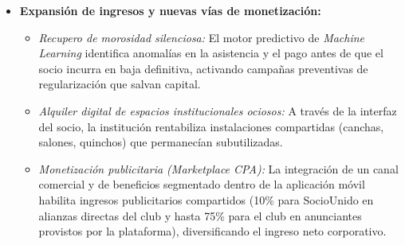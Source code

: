 \begin{itemize}
    \item \textbf{Expansión de ingresos y nuevas vías de monetización:}
    \begin{itemize}
        \item \textit{Recupero de morosidad silenciosa:} El motor predictivo de \textit{Machine Learning} identifica anomalías en la asistencia y el pago antes de que el socio incurra en baja definitiva, activando campañas preventivas de regularización que salvan capital.
        \item \textit{Alquiler digital de espacios institucionales ociosos:} A través de la interfaz del socio, la institución rentabiliza instalaciones compartidas (canchas, salones, quinchos) que permanecían subutilizadas.
        \item \textit{Monetización publicitaria (\textit{Marketplace CPA}):} La integración de un canal comercial y de beneficios segmentado dentro de la aplicación móvil habilita ingresos publicitarios compartidos (10\% para SocioUnido en alianzas directas del club y hasta 75\% para el club en anunciantes provistos por la plataforma), diversificando el ingreso neto corporativo.
    \end{itemize}
\end{itemize}
